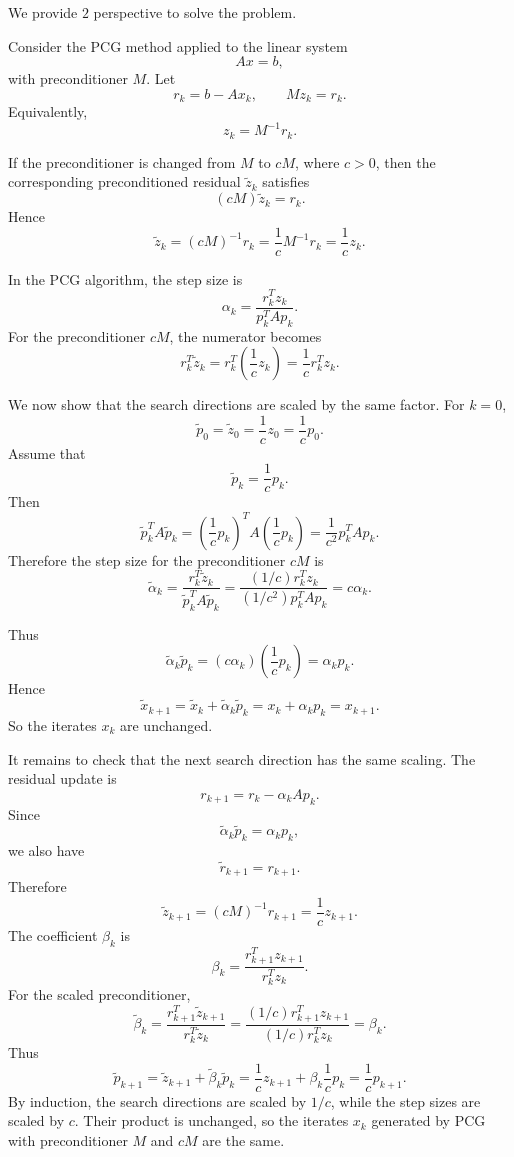 \documentclass{ctexart}
\begin{document}
We provide \(2 \) perspective to solve the problem.
\begin{solution}
  Consider the PCG method applied to the linear system
  \[
    Ax=b,
  \]
  with preconditioner \(M\). Let
  \[
    r_k=b-Ax_k,\qquad Mz_k=r_k.
  \]
  Equivalently,
  \[
    z_k=M^{-1}r_k.
  \]

  If the preconditioner is changed from \(M\) to \(cM\), where \(c>0\), then
  the corresponding preconditioned residual \(\widetilde z_k\) satisfies
  \[
    (cM)\widetilde z_k=r_k.
  \]
  Hence
  \[
    \widetilde z_k=(cM)^{-1}r_k
    =\frac{1}{c}M^{-1}r_k
    =\frac{1}{c}z_k.
  \]

  In the PCG algorithm, the step size is
  \[
    \alpha_k=\frac{r_k^Tz_k}{p_k^TAp_k}.
  \]
  For the preconditioner \(cM\), the numerator becomes
  \[
    r_k^T\widetilde z_k
    =
    r_k^T\left(\frac{1}{c}z_k\right)
    =
    \frac{1}{c}r_k^Tz_k.
  \]

  We now show that the search directions are scaled by the same factor.
  For \(k=0\),
  \[
    \widetilde p_0=\widetilde z_0=\frac{1}{c}z_0=\frac{1}{c}p_0.
  \]
  Assume that
  \[
    \widetilde p_k=\frac{1}{c}p_k.
  \]
  Then
  \[
    \widetilde p_k^TA\widetilde p_k
    =
    \left(\frac{1}{c}p_k\right)^T
    A
    \left(\frac{1}{c}p_k\right)
    =
    \frac{1}{c^2}p_k^TAp_k.
  \]
  Therefore the step size for the preconditioner \(cM\) is
  \[
    \widetilde\alpha_k
    =
    \frac{r_k^T\widetilde z_k}
    {\widetilde p_k^TA\widetilde p_k}
    =
    \frac{(1/c)r_k^Tz_k}{(1/c^2)p_k^TAp_k}
    =
    c\alpha_k.
  \]

  Thus
  \[
    \widetilde\alpha_k\widetilde p_k
    =
    (c\alpha_k)\left(\frac{1}{c}p_k\right)
    =
    \alpha_kp_k.
  \]
  Hence
  \[
    \widetilde x_{k+1}
    =
    \widetilde x_k+\widetilde\alpha_k\widetilde p_k
    =
    x_k+\alpha_kp_k
    =
    x_{k+1}.
  \]
  So the iterates \(x_k\) are unchanged.

  It remains to check that the next search direction has the same scaling.
  The residual update is
  \[
    r_{k+1}=r_k-\alpha_kAp_k.
  \]
  Since
  \[
    \widetilde\alpha_k\widetilde p_k=\alpha_kp_k,
  \]
  we also have
  \[
    \widetilde r_{k+1}=r_{k+1}.
  \]
  Therefore
  \[
    \widetilde z_{k+1}
    =
    (cM)^{-1}r_{k+1}
    =
    \frac{1}{c}z_{k+1}.
  \]
  The coefficient \(\beta_k\) is
  \[
    \beta_k=\frac{r_{k+1}^Tz_{k+1}}{r_k^Tz_k}.
  \]
  For the scaled preconditioner,
  \[
    \widetilde\beta_k
    =
    \frac{r_{k+1}^T\widetilde z_{k+1}}
    {r_k^T\widetilde z_k}
    =
    \frac{(1/c)r_{k+1}^Tz_{k+1}}
    {(1/c)r_k^Tz_k}
    =
    \beta_k.
  \]
  Thus
  \[
    \widetilde p_{k+1}
    =
    \widetilde z_{k+1}
    +
    \widetilde\beta_k\widetilde p_k
    =
    \frac{1}{c}z_{k+1}
    +
    \beta_k\frac{1}{c}p_k
    =
    \frac{1}{c}p_{k+1}.
  \]
  By induction, the search directions are scaled by \(1/c\), while the step
  sizes are scaled by \(c\). Their product is unchanged, so the iterates
  \(x_k\) generated by PCG with preconditioner \(M\) and \(cM\) are the same.
\end{solution}
\end{document}
